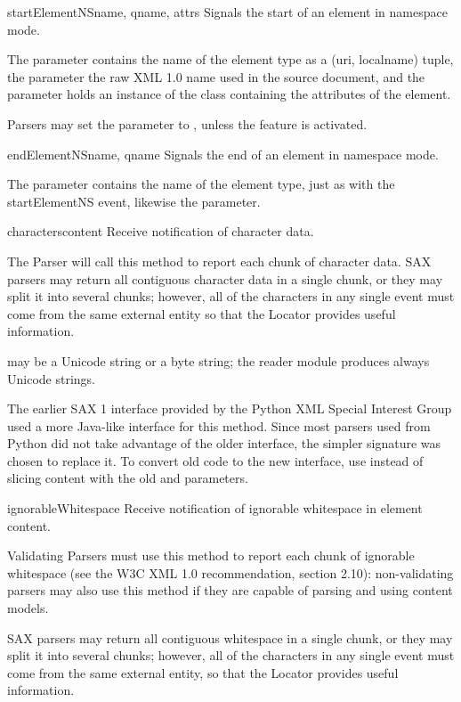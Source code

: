 \begin{methoddesc}[ContentHandler]{startElementNS}{name, qname, attrs}
  Signals the start of an element in namespace mode.

  The  parameter contains the name of the element type as a
  (uri, localname) tuple, the  parameter the raw XML 1.0
  name used in the source document, and the  parameter
  holds an instance of the  class containing the
  attributes of the element.

  Parsers may set the  parameter to , unless the
   feature is
  activated.
\end{methoddesc}

\begin{methoddesc}[ContentHandler]{endElementNS}{name, qname}
  Signals the end of an element in namespace mode.

  The  parameter contains the name of the element type, just
  as with the startElementNS event, likewise the  parameter.
\end{methoddesc}

\begin{methoddesc}[ContentHandler]{characters}{content}
  Receive notification of character data.
        
  The Parser will call this method to report each chunk of character
  data. SAX parsers may return all contiguous character data in a
  single chunk, or they may split it into several chunks; however, all
  of the characters in any single event must come from the same
  external entity so that the Locator provides useful information.

   may be a Unicode string or a byte string; the
   reader module produces always Unicode strings.

    The earlier SAX 1 interface provided by the Python
  XML Special Interest Group used a more Java-like interface for this
  method.  Since most parsers used from Python did not take advantage
  of the older interface, the simpler signature was chosen to replace
  it.  To convert old code to the new interface, use 
  instead of slicing content with the old  and
   parameters.
\end{methoddesc}

\begin{methoddesc}[ContentHandler]{ignorableWhitespace}{}
  Receive notification of ignorable whitespace in element content.
        
  Validating Parsers must use this method to report each chunk
  of ignorable whitespace (see the W3C XML 1.0 recommendation,
  section 2.10): non-validating parsers may also use this method
  if they are capable of parsing and using content models.
  
  SAX parsers may return all contiguous whitespace in a single
  chunk, or they may split it into several chunks; however, all
  of the characters in any single event must come from the same
  external entity, so that the Locator provides useful
  information.
\end{methoddesc}

